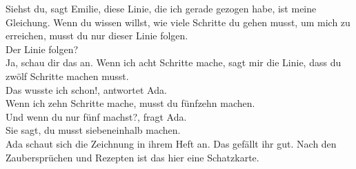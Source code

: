 \frqq{}Siehst du\flqq{}, sagt Emilie, \frqq{}diese Linie, die ich gerade gezogen habe, ist meine Gleichung. Wenn du wissen willst, wie viele Schritte du gehen musst, um mich zu erreichen, musst du nur dieser Linie folgen.\flqq{}\\
\frqq{}Der Linie folgen?\flqq{}\\
\frqq{}Ja, schau dir das an. Wenn ich acht Schritte mache, sagt mir die Linie, dass du zwölf Schritte machen musst.\flqq{}\\
\frqq{}Das wusste ich schon!\flqq{}, antwortet Ada.\\
\frqq{}Wenn ich zehn Schritte mache, musst du fünfzehn machen.\flqq{}\\ 
\frqq{}Und wenn du nur fünf machst?\flqq{}, fragt Ada.\\
\frqq{}Sie sagt, du musst siebeneinhalb machen.\flqq{}\\
Ada schaut sich die Zeichnung in ihrem Heft an. Das gefällt ihr gut. Nach den Zaubersprüchen und Rezepten ist das hier eine Schatzkarte.
